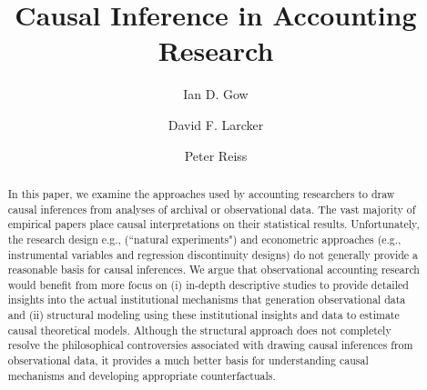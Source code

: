 \documentclass[11pt]{amsart}
\title[Causal Inference]{Causal Inference in Accounting Research}
\author{Ian D. Gow \and David F. Larcker \and Peter Reiss}
\begin{document}
\usetikzlibrary{automata, shapes, calc, positioning}



\maketitle



\begin{abstract}
	In this paper, we examine the approaches used by accounting researchers to draw causal inferences from analyses of archival or observational data. The vast majority of empirical papers place causal interpretations on their statistical results.
	Unfortunately, the research design e.g., (``natural experiments") and econometric approaches (e.g., instrumental variables and regression discontinuity designs) do not generally provide a reasonable basis for causal inferences.
	We argue that observational accounting research would benefit from more focus on (i) in-depth descriptive studies to provide detailed insights into the actual institutional mechanisms that generation observational data and (ii) structural modeling using these institutional insights and data to estimate causal theoretical models.  
	Although the structural approach does not completely resolve the philosophical controversies associated with drawing causal inferences from observational data, it provides a much better basis for understanding causal mechanisms and developing appropriate counterfactuals.
\end{abstract}
\end{document}
